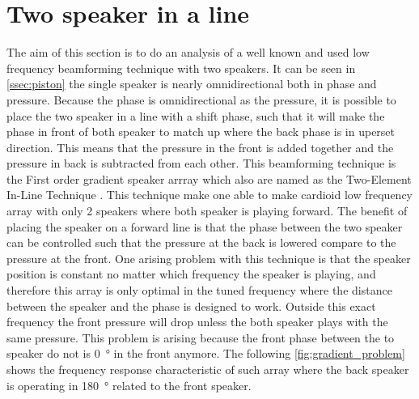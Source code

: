 \stopexplain



\section{Two speaker in a line}\label{sec:first_order_speaker}
The aim of this section is to do an analysis of a well known and used low frequency beamforming technique with two speakers. It can be seen in \autoref{ssec:piston} the single speaker is nearly omnidirectional both in phase and pressure. Because the phase is omnidirectional as the pressure, it is possible to place the two speaker in a line with a shift phase, such that it will make the phase in front of both speaker to match up where the back phase is in uperset  direction. This means that the pressure in the front is added together and the pressure in back is subtracted from each other. This beamforming technique is the First order gradient speaker arrray \citep{olson1973gradient} which also are named as the Two-Element In-Line Technique \citep{McCarthy2016}. This technique make one able to make cardioid low frequency array with only 2 speakers where both speaker is playing forward. The benefit of placing the speaker on a forward line is that the phase between the two speaker can be controlled such that the pressure at the back is lowered compare to the pressure at the front. One arising problem with this technique is that the speaker position is constant no matter which frequency the speaker is playing, and therefore this array is only optimal in the tuned frequency where the distance between the speaker and the phase is designed to work. Outside this exact frequency the front pressure will drop unless the both speaker plays with the same pressure. This problem is arising because the front phase between the to speaker do not is \SI{0}{\degree} in the front anymore. The following \autoref{fig:gradient_problem} shows the frequency response characteristic of such array where the back speaker is operating in \SI{180}{\degree} related to the front speaker.


